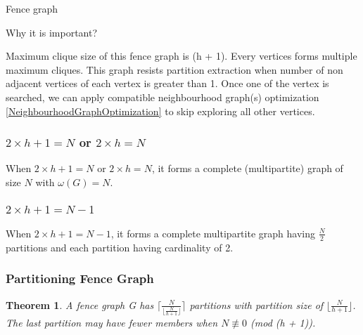 \documentclass[12pt]{article}
\theoremstyle{plain}
\newtheorem{theorem}{Theorem}[section] %
\theoremstyle{definition}
\newcommand{\floor}[1]{\lfloor #1 \rfloor}
\newcommand{\ceil}[1]{\lceil #1 \rceil}
\begin{document}
\begin{center}
	{\large Fence graph }
\end{center}


Why it is important?

Maximum clique size of this fence graph is (h + 1). Every vertices forms multiple maximum cliques. This graph resists partition extraction when number of non adjacent vertices of each vertex is greater than 1. Once one of the vertex is searched, we can apply compatible neighbourhood graph(s) optimization \ref{NeighbourhoodGraphOptimization} to skip exploring all other vertices.

\subsubsection{$2 \times h + 1 = N$ or $2 \times h = N$}
When $2 \times h + 1 = N$ or $2 \times h = N$, it forms a complete (multipartite) graph of size $N$ with $\omega(G) = N$.

\subsubsection{$2 \times h + 1 = N - 1$}
When $2 \times h + 1 = N - 1$, it forms a complete multipartite graph having $\frac{N}{2}$ partitions and each partition having cardinality of 2.

\subsubsection{Partitioning Fence Graph} \label{FenceGraphPartition}
\begin{theorem}
	A fence graph G has $\ceil{\frac{N}{\floor{\frac{N}{h + 1}}}}$ partitions with partition size of $\floor{\frac{N}{h + 1}}$. The last partition may have fewer members when $N \not \equiv 0$ (mod (h + 1)).
\end{theorem}
\end{document}
